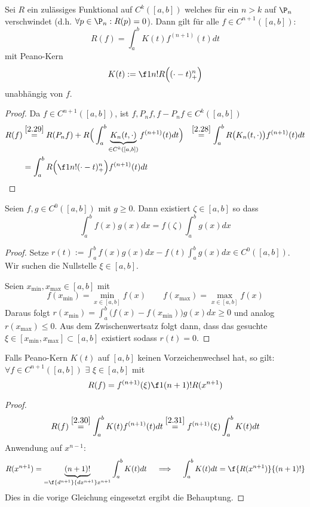 \documentclass[11pt]{scrbook}
\begin{document}
\begin{st}
	\label{2.30}
	Sei $R$ ein zulässiges Funktional auf $C^k([a,b])$ welches für ein $n>k$ auf $\P_n$ verschwindet (d.h. $\forall p\in \P_n : R(p)=0$).
	Dann gilt für alle $f\in C^{n+1}([a,b])$:
	\[
		R(f) = \int_a^b K(t) f^{(n+1)}(t) dt
	\]
	mit Peano-Kern 
	\[
		K(t) := \f 1{n!}R\Big((\cdot - t)^n_+\Big)
	\]
	unabhängig von $f$.
	\begin{proof}
		Da $f\in C^{n+1}([a,b])$, ist $f,P_nf,f-P_nf \in C^k([a,b])$
		\begin{align*}
			R(f) &\stackrel{\ref{2.29}}= R(P_n f) + R \Big( \int_a^b \underbrace{K_n(t,\cdot)}_{\in C^k([a,b])} f^{(n+1)}(t) dt \Big)
			&\stackrel{\ref{2.28}} =  \int_a^b R\big(K_n(t,\cdot)\big) f^{(n+1)}(t) dt \\
			&= \int_a^b R \Big( \f 1{n!}(\cdot - t)^n_+ \Big) f^{(n+1)}(t) dt
		\end{align*}
	\end{proof}
\end{st}

\begin{lem} \label{2.31}
	Seien $f,g \in C^0([a,b])$ mit $g\ge 0$.
	Dann existiert $\zeta \in [a,b]$ so dass
	\[
		\int_a^b f(x) g(x) dx = f(\zeta) \int_a^b g(x) dx
	\]
	\begin{proof}
		Setze $r(t) := \int_a^b f(x)g(x) dx - f(t) \int_a^b g(x) dx \in C^0([a,b])$.
		Wir suchen die Nullstelle $\xi \in [a,b]$.

		Seien $x_{\text{min}}, x_{\text{max}} \in [a,b]$ mit
		\[
			f(x_{\text{min}}) = \min_{x\in[a,b]} f(x)
			\qquad
			f(x_{\text{max}}) = \max_{x\in[a,b]} f(x)
		\]
		Daraus folgt $r(x_{\text{min}}) = \int_a^b \big(f(x)-f(x_{\text{min}})\big)g(x) dx \ge 0$ und analog $r(x_{\text{max}}) \le 0$.
		Aus dem Zwischenwertsatz folgt dann, dass das gesuchte $\xi \in[x_{\text{min}}, x_{\text{max}}] \subset [a,b]$ existiert sodass $r(t) = 0$.
	\end{proof}
\end{lem}

\begin{kor} \label{2.32}
	Falls Peano-Kern $K(t)$ auf $[a,b]$ keinen Vorzeichenwechsel hat, so gilt: \\
	$\forall f\in C^{n+1}([a,b])$  $\exists $  $\xi\in [a,b]$ mit
	\[
		R(f) = f^{(n+1)}(\xi) \f 1{(n+1)!} R(x^{n+1})
	\]
	\begin{proof}
		\[
			R(f) \stackrel{\ref{2.30}}= \int_a^b K(t) f^{(n+1)}(t) dt 
			\stackrel{\ref{2.31}}= f^{(n+1)}(\xi)\int_a^b K(t) dt
		\]
		Anwendung auf $x^{n-1}$:
		\[
			R(x^{n+1}) = \underbrace{(n+1)!}_{=\f {d^{n+1}}{dx^{n+1}}x^{n+1}} \int_a^b K(t) dt \quad 
			\implies \quad \int_a^b K(t) dt = \f {R(x^{n+1})}{(n+1)!}
		\]
		Dies in die vorige Gleichung eingesetzt ergibt die Behauptung.
	\end{proof}
\end{kor}
\end{document}
